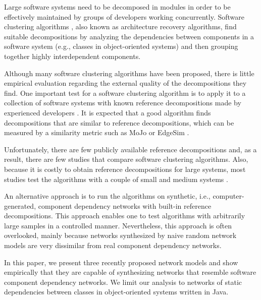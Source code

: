 %

Large software systems need to be decomposed in modules in order to be
effectively maintained by groups of developers working concurrently. Software
clustering algorithms
\cite{Mancoridis1998,Anquetil1999,Tzerpos2000,Andritsos2005}, also known as
architecture recovery algorithms, find suitable decompositions by analyzing the
dependencies between components in a software system (e.g., classes in
object-oriented systems) and then grouping together highly interdependent
components. 

Although many software clustering algorithms have been proposed, there is little
empirical evaluation regarding the external quality of the decompositions they
find. One important test for a software clustering algorithm is to apply it to a
collection of software systems with known reference decompositions made by
experienced developers \cite{Anquetil1999}. It is expected that a good algorithm
finds decompositions that are similar to reference decompositions, which can be
measured by a similarity metric such as MoJo \cite{Tzerpos1999} or EdgeSim
\cite{Mitchell2001}.

Unfortunately, there are few publicly available reference decompositions
\cite{Koschke2000} and, as a result, there are few studies that compare software
clustering algorithms. Also, because it is costly to obtain reference
decompositions for large systems, most studies test the algorithms with a couple
of small and medium systems \cite{Anquetil1999,Maqbool2007,Bittencourt2009}.

An alternative approach is to run the algorithms on synthetic, i.e., computer-
generated, component dependency networks with built-in reference decompositions.
This approach enables one to test algorithms with arbitrarily large samples in a
controlled manner. Nevertheless, this approach is often overlooked, mainly
because networks synthesized by naive random network models are very dissimilar
from real component dependency networks.

In this paper, we present three recently proposed network models and show
empirically that they are capable of synthesizing networks that resemble
software component dependency networks. We limit our analysis to networks of
static dependencies between classes in object-oriented systems written in Java.

